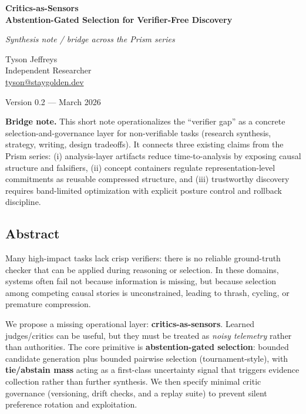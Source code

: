 \documentclass[11pt]{article}
\begin{document}
\begin{titlepage}
\thispagestyle{empty}
\raggedright

\vspace*{0.62\textheight}

{\Large\bfseries Critics-as-Sensors\\\large Abstention-Gated Selection for Verifier-Free Discovery\par}

\vspace{0.4em}
{\large\itshape Synthesis note / bridge across the Prism series\par}

\vspace{1.6em}

Tyson Jeffreys\\
Independent Researcher\\
\href{mailto:tyson@staygolden.dev}{tyson@staygolden.dev}

\vspace{1.6em}

Version 0.2 --- March 2026

\end{titlepage}

\noindent\textbf{Bridge note.} This short note operationalizes the ``verifier gap'' as a concrete selection-and-governance layer for non-verifiable tasks (research synthesis, strategy, writing, design tradeoffs). It connects three existing claims from the Prism series: (i) analysis-layer artifacts reduce time-to-analysis by exposing causal structure and falsifiers, (ii) concept containers regulate representation-level commitments as reusable compressed structure, and (iii) trustworthy discovery requires band-limited optimization with explicit posture control and rollback discipline.
\par\medskip

\hypertarget{abstract}{%
\subsection{Abstract}\label{abstract}}

Many high-impact tasks lack crisp verifiers: there is no reliable ground-truth checker that can be applied during reasoning or selection. In these domains, systems often fail not because information is missing, but because selection among competing causal stories is unconstrained, leading to thrash, cycling, or premature compression.

We propose a missing operational layer: \textbf{critics-as-sensors}. Learned judges/critics can be useful, but they must be treated as \emph{noisy telemetry} rather than authorities. The core primitive is \textbf{abstention-gated selection}: bounded candidate generation plus bounded pairwise selection (tournament-style), with \textbf{tie/abstain mass} acting as a first-class uncertainty signal that triggers evidence collection rather than further synthesis. We then specify minimal critic governance (versioning, drift checks, and a replay suite) to prevent silent preference rotation and exploitation.
\end{document}
